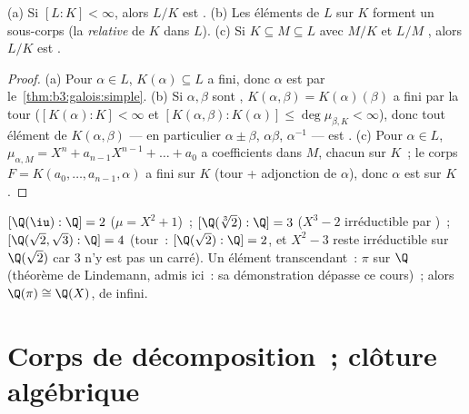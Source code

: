 \begin{corollary}\label{cor:b3:galois:algclosed}
(a) Si $[L:K] < \infty$, alors $L/K$ est .
(b) Les éléments de $L$  sur $K$ forment un sous-corps
(la \emph{ relative} de $K$ dans $L$).
(c) Si $K \subseteq M \subseteq L$ avec $M/K$ et $L/M$
, alors $L/K$ est .
\end{corollary}

\begin{proof}
(a) Pour $\alpha \in L$, $K(\alpha) \subseteq L$ a  fini,
donc $\alpha$ est  par le~\cref{thm:b3:galois:simple}.
(b) Si $\alpha, \beta$ sont , $K(\alpha, \beta) =
K(\alpha)(\beta)$ a  fini par la tour
($[K(\alpha):K] < \infty$ et $[K(\alpha,\beta):K(\alpha)] \leq
\deg\mu_{\beta,K} < \infty$), donc tout élément de $K(\alpha,
\beta)$ --- en particulier $\alpha \pm \beta$, $\alpha\beta$,
$\alpha^{-1}$ --- est . (c) Pour $\alpha \in L$,
$\mu_{\alpha, M} = X^n + a_{n-1}X^{n-1} + \dots + a_0$ a
coefficients dans $M$, chacun  sur $K$~; le corps $F =
K(a_0, \dots, a_{n-1}, \alpha)$ a  fini sur $K$ (tour +
adjonction de $\alpha$), donc $\alpha$ est  sur $K$.
\end{proof}

\begin{example}\label{ex:b3:galois:degrees}
$[\Q(\iu):\Q] = 2$ ($\mu = X^2 + 1$)~; $[\Q(\sqrt[3]{2}):\Q] =
3$ ($X^3 - 2$ irréductible par )~; $[\Q(\sqrt2,
\sqrt3):\Q] = 4$ (tour~: $[\Q(\sqrt2):\Q] = 2$, et $X^2 - 3$
reste irréductible sur $\Q(\sqrt2)$ car $3$ n'y est pas un
carré). Un élément transcendant~: $\pi$ sur $\Q$ (théorème de
Lindemann, admis ici~: sa démonstration dépasse ce cours)~;
alors $\Q(\pi) \cong \Q(X)$, de  infini.
\end{example}

\section{Corps de décomposition~; clôture algébrique}

